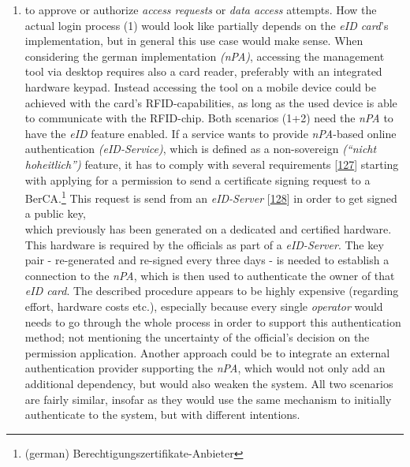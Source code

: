 \documentclass[12pt,english,a4paper,titlepage,cleardoublepage=empty,dottedtoc]{report}
\providecommand{\tightlist}{%
  \setlength{\itemsep}{0pt}\setlength{\parskip}{0pt}}
\begin{document}
\begin{enumerate}
\def\labelenumi{(\arabic{enumi})}
\setcounter{enumi}{1}
\tightlist
\item
  to approve or authorize \emph{access requests} or \emph{data access}
  attempts. How the actual login process (1) would look like partially
  depends on the \emph{eID card}'s implementation, but in general this
  use case would make sense. When considering the german implementation
  \emph{(nPA)}, accessing the management tool via desktop requires also
  a card reader, preferably with an integrated hardware keypad. Instead
  accessing the tool on a mobile device could be achieved with the
  card's RFID-capabilities, as long as the used device is able to
  communicate with the RFID-chip. Both scenarios (1+2) need the
  \emph{nPA} to have the \emph{eID} feature enabled. If a service wants
  to provide \emph{nPA}-based online authentication
  \emph{(eID-Service)}, which is defined as a non-sovereign
  \emph{(``nicht hoheitlich'')} feature, it has to comply with several
  requirements {[}\protect\hyperlink{ref-web_bsi-spec_eid}{127}{]}
  starting with applying for a permission to send a certificate signing
  request to a BerCA.\footnote{(german)
    Berechtigungszertifikate-Anbieter} This request is send from an
  \emph{eID-Server}
  {[}\protect\hyperlink{ref-web_2017_npa-eid-server}{128}{]} in order to
  get signed a public key,\\
  which previously has been generated on a dedicated and certified
  hardware. This hardware is required by the officials as part of a
  \emph{eID-Server}. The key pair - re-generated and re-signed every
  three days - is needed to establish a connection to the \emph{nPA},
  which is then used to authenticate the owner of that \emph{eID card}.
  The described procedure appears to be highly expensive (regarding
  effort, hardware costs etc.), especially because every single
  \emph{operator} would needs to go through the whole process in order
  to support this authentication method; not mentioning the uncertainty
  of the official's decision on the permission application. Another
  approach could be to integrate an external authentication provider
  supporting the \emph{nPA}, which would not only add an additional
  dependency, but would also weaken the system. All two scenarios are
  fairly similar, insofar as they would use the same mechanism to
  initially authenticate to the system, but with different intentions.
\end{enumerate}
\end{document}
